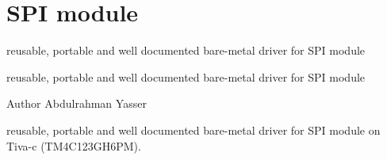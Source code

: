 \chapter{SPI module}
\hypertarget{index}{}\label{index}
reusable, portable and well documented bare-\/metal driver for SPI module

reusable, portable and well documented bare-\/metal driver for SPI module \begin{DoxyAuthor}{Author}
Abdulrahman Yasser
\end{DoxyAuthor}
reusable, portable and well documented bare-\/metal driver for SPI module on Tiva-\/c (TM4\+C123\+GH6\+PM). 